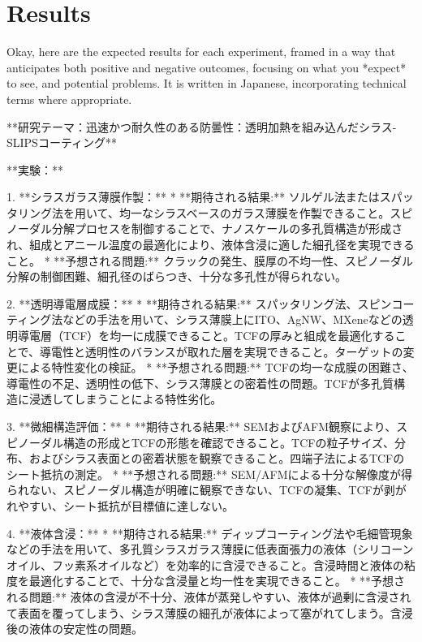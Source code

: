 \documentclass{article}
\begin{document}
\section{Results}
Okay, here are the expected results for each experiment, framed in a way that anticipates both positive and negative outcomes, focusing on what you *expect* to see, and potential problems. It is written in Japanese, incorporating technical terms where appropriate.

**研究テーマ：迅速かつ耐久性のある防曇性：透明加熱を組み込んだシラス-SLIPSコーティング**

**実験：**

1.  **シラスガラス薄膜作製：**
    *   **期待される結果:** ソルゲル法またはスパッタリング法を用いて、均一なシラスベースのガラス薄膜を作製できること。スピノーダル分解プロセスを制御することで、ナノスケールの多孔質構造が形成され、組成とアニール温度の最適化により、液体含浸に適した細孔径を実現できること。
    *   **予想される問題:** クラックの発生、膜厚の不均一性、スピノーダル分解の制御困難、細孔径のばらつき、十分な多孔性が得られない。

2.  **透明導電層成膜：**
    *   **期待される結果:** スパッタリング法、スピンコーティング法などの手法を用いて、シラス薄膜上にITO、AgNW、MXeneなどの透明導電層（TCF）を均一に成膜できること。TCFの厚みと組成を最適化することで、導電性と透明性のバランスが取れた層を実現できること。ターゲットの変更による特性変化の検証。
    *   **予想される問題:** TCFの均一な成膜の困難さ、導電性の不足、透明性の低下、シラス薄膜との密着性の問題。TCFが多孔質構造に浸透してしまうことによる特性劣化。

3.  **微細構造評価：**
    *   **期待される結果:** SEMおよびAFM観察により、スピノーダル構造の形成とTCFの形態を確認できること。TCFの粒子サイズ、分布、およびシラス表面との密着状態を観察できること。四端子法によるTCFのシート抵抗の測定。
    *   **予想される問題:** SEM/AFMによる十分な解像度が得られない、スピノーダル構造が明確に観察できない、TCFの凝集、TCFが剥がれやすい、シート抵抗が目標値に達しない。

4.  **液体含浸：**
    *   **期待される結果:** ディップコーティング法や毛細管現象などの手法を用いて、多孔質シラスガラス薄膜に低表面張力の液体（シリコーンオイル、フッ素系オイルなど）を効率的に含浸できること。含浸時間と液体の粘度を最適化することで、十分な含浸量と均一性を実現できること。
    *   **予想される問題:** 液体の含浸が不十分、液体が蒸発しやすい、液体が過剰に含浸されて表面を覆ってしまう、シラス薄膜の細孔が液体によって塞がれてしまう。含浸後の液体の安定性の問題。
\end{document}
